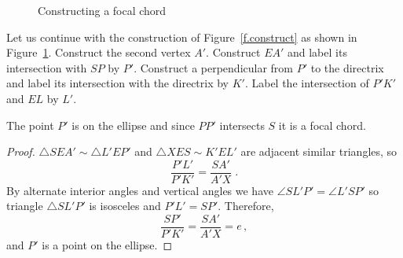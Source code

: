 \begin{figure}
\begin{center}
\end{center}
\caption{Constructing a focal chord}\label{f.focal-chord}
\end{figure}


Let us continue with the construction of Figure~\ref{f.construct} as shown in Figure~\ref{f.focal-chord}. Construct the second vertex $A'$. Construct $EA'$ and label its intersection with $SP$ by $P'$. Construct a perpendicular from $P'$ to the directrix and label its intersection with the directrix by $K'$. Label the intersection of $P'K'$ and $EL$ by $L'$.
\begin{theorem}
The point $P'$ is on the ellipse and since $PP'$ intersects $S$ it is a focal chord.
\end{theorem}
\begin{proof}
$\triangle SEA' \sim \triangle L'EP'$ and $\triangle XES\sim K'EL'$ are adjacent similar triangles, so
\[
\frac{P'L'}{P'K'}=\frac{SA'}{A'X}\;.
\]
By alternate interior angles and vertical angles we have $\angle SL'P'=\angle L'SP'$ so triangle $\triangle SL'P'$ is isosceles and $P'L'=SP'$. Therefore,
\[
\frac{SP'}{P'K'}=\frac{SA'}{A'X}=e\,,
\]
and $P'$ is a point on the ellipse.\hqed
\end{proof}



